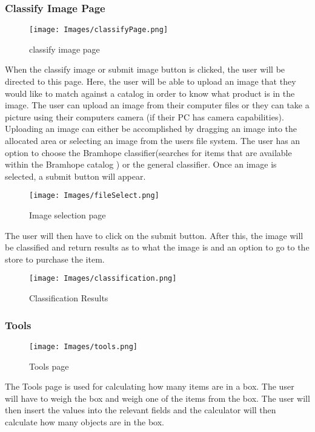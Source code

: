 \documentclass[a4paper, 12pt]{article}
\begin{document}
\subsubsection{Classify Image Page}
\begin{figure}[h!]
\texttt{[image: Images/classifyPage.png]}
\centering
\caption{classify image page} 
\end{figure}
When the classify image or submit image button is clicked, the user will be directed to this page. Here, the user will be able to upload an image that they would like to match against a catalog in order to know what product is in the image. The user can upload an image from their computer files or they can take a picture using their computers camera (if their PC has camera capabilities).\linebreak
Uploading an image can either be accomplished by dragging an image into the allocated area or selecting an image from the users file system.\linebreak
The user has an option to choose the Bramhope classifier(searches for items that are available within the Bramhope catalog ) or the general classifier. 
Once an image is selected, a submit button will appear.
\linebreak
\newpage
\begin{figure}[!ht]
\texttt{[image: Images/fileSelect.png]}
\centering
\caption{Image selection page} 
\end{figure}
The user will then have to click on the submit button.
After this, the image will be classified and return results as to what the image is and an option to go to the store to purchase the item.
\begin{figure}[!ht]
\texttt{[image: Images/classification.png]}
\centering
\caption{Classification Results} 
\end{figure}
\newpage
\subsubsection{Tools}
\begin{figure}[!ht]
\texttt{[image: Images/tools.png]}
\centering
\caption{Tools page} 
\end{figure}
The Tools page is used for calculating how many items are in a box.
The user will have to weigh the box and weigh one of the items from the box. The user will then insert the values into the relevant fields and the calculator will then calculate how many objects are in the box. 
\linebreak
\end{document}
